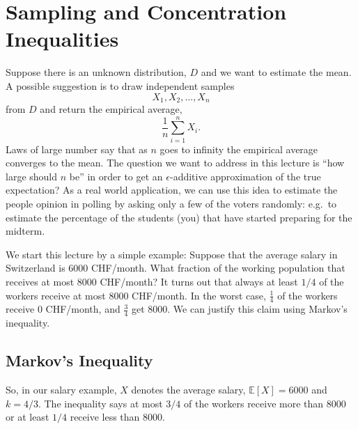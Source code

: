 \section{Sampling and Concentration Inequalities}

Suppose there is an unknown distribution, $D$ and we want to estimate the mean. A possible suggestion is to draw independent samples
\[
  X_1, X_2, \ldots, X_n
\]
from $D$ and return the empirical average,
\[
  \frac{1}{n}\sum_{i=1}^n X_i .
\]
Laws of large number say that as $n$ goes to infinity the empirical average converges to the mean. The question we want to address in this lecture is ``how large should $n$ be'' in order to get an $\epsilon$-additive approximation of the true expectation? As a real world application, we can use this idea to estimate the people opinion in polling by asking only a few of the voters randomly: e.g.\ to estimate the percentage of the students (you) that have started preparing for the midterm.

We start this lecture by a simple example: Suppose that the average salary in Switzerland is 6000 CHF/month. What fraction of the working population that receives at most 8000 CHF/month? It turns out that always at least $1/4$ of the workers receive at most 8000 CHF/month. In the worst case, $\frac14$ of the workers receive 0 CHF/month, and $\frac34$ get 8000. We can justify this claim using Markov's inequality.

\subsection{Markov's Inequality}


So, in our salary example, $X$ denotes the average salary, $\mathbb{E}[X]=6000$ and $k=4/3$. The inequality says at most $3/4$ of the workers receive more than 8000 or at least $1/4$ receive less than 8000.


